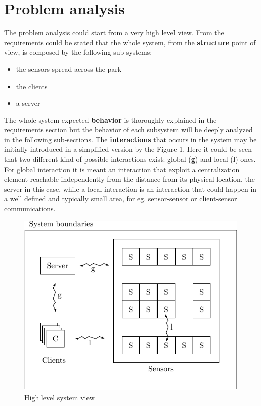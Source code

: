 \documentclass[11pt]{article}
\begin{document}
\section{Problem analysis}
The problem analysis could start from a very high level view. From the requirements could be stated that the whole system, from the \textbf{structure} point of view, is composed by the following sub-systems:
\begin{itemize}
\item the sensors spread across the park
\item the clients
\item a server
\end{itemize}
The whole system expected \textbf{behavior} is thoroughly explained in the requirements section but the behavior of each subsystem will be deeply analyzed in the following sub-sections. The \textbf{interactions} that occurs in the system may be initially introduced in a simplified version by the Figure 1. Here it could be seen that two different kind of possible interactions exist: global (\textbf{g}) and local (\textbf{l}) ones. For global interaction it is meant an interaction that exploit a centralization element reachable independently from the distance from its physical location, the server in this case, while a local interaction is an interaction that could happen in a well defined and typically small area, for eg. sensor-sensor or client-sensor communications.  

\begin{figure}
  \centering
	\includegraphics[scale=1]{system}
  \caption{High level system view}
\end{figure}
\end{document}
